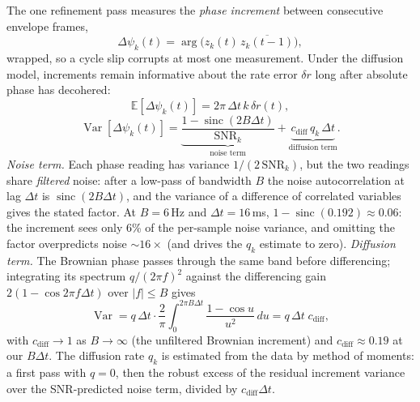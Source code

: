 \documentclass[journal]{IEEEtran}
\newcommand{\snr}{\ensuremath{\mathrm{SNR}}}
\begin{document}
The one refinement pass measures the \emph{phase increment} between
consecutive envelope frames,
\begin{equation}
  \Delta\psi_k(t) = \arg\big( z_k(t)\, \overline{z_k(t{-}1)} \big),
  \label{eq:increment}
\end{equation}
wrapped, so a cycle slip corrupts at most one measurement. Under the
diffusion model, increments remain informative about the rate error
$\delta r$ long after absolute phase has decohered:
\begin{equation}
  \mathbb{E}[\Delta\psi_k(t)] = 2\pi\,\Delta t\, k\, \delta r(t),
  \label{eq:incmean}
\end{equation}
\begin{equation}
  \operatorname{Var}[\Delta\psi_k(t)] =
  \underbrace{\frac{1 - \operatorname{sinc}(2B\Delta t)}%
  {\snr_k}}_{\text{noise term}}
  + \underbrace{c_{\mathrm{diff}}\, q_k\, \Delta t}_{\text{diffusion
  term}} .
  \label{eq:incvar}
\end{equation}
\emph{Noise term.} Each phase reading has variance $1/(2\,\snr_k)$, but
the two readings share \emph{filtered} noise: after a low-pass of
bandwidth $B$ the noise autocorrelation at lag $\Delta t$ is
$\operatorname{sinc}(2B\Delta t)$, and the variance of a difference of
correlated variables gives the stated factor. At $B = 6$\,Hz and $\Delta
t = 16$\,ms, $1 - \operatorname{sinc}(0.192) \approx 0.06$: the increment
sees only 6\% of the per-sample noise variance, and omitting the factor
overpredicts noise ${\sim}16\times$ (and drives the $q_k$ estimate to
zero). \emph{Diffusion term.} The Brownian phase passes through the same
band before differencing; integrating its spectrum $q/(2\pi f)^2$ against
the differencing gain $2(1 - \cos 2\pi f\Delta t)$ over $|f| \le B$ gives
\begin{equation}
  \operatorname{Var} = q\,\Delta t \cdot \frac{2}{\pi}
  \int_0^{2\pi B \Delta t} \frac{1 - \cos u}{u^2}\, du
  = q\,\Delta t\; c_{\mathrm{diff}} ,
  \label{eq:cdiff}
\end{equation}
with $c_{\mathrm{diff}} \to 1$ as $B \to \infty$ (the unfiltered Brownian
increment) and $c_{\mathrm{diff}} \approx 0.19$ at our $B\Delta t$. The
diffusion rate $q_k$ is estimated from the data by method of moments: a
first pass with $q = 0$, then the robust excess of the residual increment
variance over the SNR-predicted noise term, divided by
$c_{\mathrm{diff}}\Delta t$.
\end{document}
